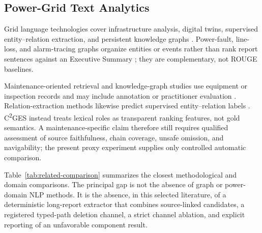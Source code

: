 \documentclass[applsci,article,submit,moreauthors]{Definitions/mdpi}
\newcommand{\cges}{C\textsuperscript{2}GES}
\begin{document}
\subsection{Power-Grid Text Analytics}

Grid language technologies cover infrastructure analysis, digital twins, supervised entity--relation extraction, and persistent knowledge graphs \cite{xie2022massively,hamann2024foundation,madabhushi2023survey,srinivasan2023artificial,ranawaka2024leveraging,meng2023gridfield}. Power-fault, line-loss, and alarm-tracing graphs organize entities or events rather than rank report sentences against an Executive Summary \cite{liu2022powerfault,li2024lineloss,ma2025alarm}; they are complementary, not ROUGE baselines.

Maintenance-oriented retrieval and knowledge-graph studies use equipment or inspection records and may include annotation or practitioner evaluation \cite{cao2024coalmaintenance,zgg2026bridge,dimaggio2025predictivemaintenance}. Relation-extraction methods likewise predict supervised entity--relation labels \cite{li2025moere,she2025clear}. \cges{} instead treats lexical roles as transparent ranking features, not gold semantics. A maintenance-specific claim therefore still requires qualified assessment of source faithfulness, chain coverage, unsafe omission, and navigability; the present proxy experiment supplies only controlled automatic comparison.

Table~\ref{tab:related-comparison} summarizes the closest methodological and domain comparisons. The principal gap is not the absence of graph or power-domain NLP methods. It is the absence, in this selected literature, of a deterministic long-report extractor that combines source-linked candidates, a registered typed-path deletion channel, a strict channel ablation, and explicit reporting of an unfavorable component result.
\end{document}
